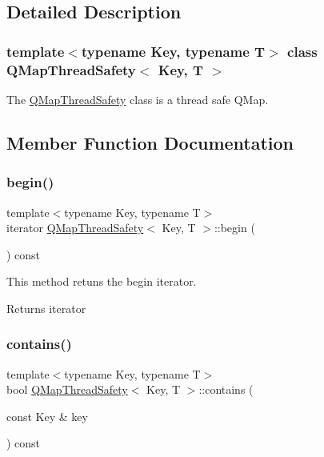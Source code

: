 \subsection{Detailed Description}
\subsubsection*{template$<$typename Key, typename T$>$\newline
class Q\+Map\+Thread\+Safety$<$ Key, T $>$}

The \hyperlink{class_q_map_thread_safety}{Q\+Map\+Thread\+Safety} class is a thread safe Q\+Map. 

\subsection{Member Function Documentation}
\mbox{\label{class_q_map_thread_safety_ac197a5375913e4ac19910b9bc4191a95}} 
\subsubsection{\texorpdfstring{begin()}{begin()}}
{\footnotesize\ttfamily template$<$typename Key, typename T$>$ \\
iterator \hyperlink{class_q_map_thread_safety}{Q\+Map\+Thread\+Safety}$<$ Key, T $>$\+::begin (\begin{DoxyParamCaption}{ }\end{DoxyParamCaption}) const\hspace{0.3cm}{\ttfamily [inline]}}



This method retuns the begin iterator. 

\begin{DoxyReturn}{Returns}
iterator 
\end{DoxyReturn}
\mbox{\label{class_q_map_thread_safety_acaafd9933cb391e27a81c26df712786b}} 
\subsubsection{\texorpdfstring{contains()}{contains()}}
{\footnotesize\ttfamily template$<$typename Key, typename T$>$ \\
bool \hyperlink{class_q_map_thread_safety}{Q\+Map\+Thread\+Safety}$<$ Key, T $>$\+::contains (\begin{DoxyParamCaption}\item[{const Key \&}]{key }\end{DoxyParamCaption}) const\hspace{0.3cm}{\ttfamily [inline]}}



